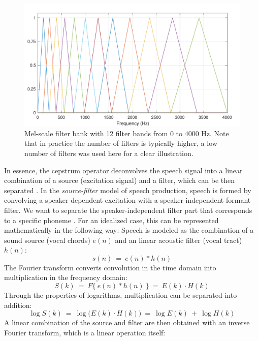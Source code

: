 \documentclass[english, 12pt, a4paper, pdftex, elec, utf8]{aaltothesis}
\begin{document}
\begin{figure}[t]
	\centering
	\includegraphics[trim={0.1cm 0cm 0cm 0.5cm}, clip, width=\textwidth]{melfilter.pdf}
	\caption{Mel-scale filter bank with 12 filter bands from 0 to 4000 Hz. Note that in practice the number of filters is typically higher, a low number of filters was used here for a clear illustration.}
	\label{fig:melbank} 
\end{figure}
In essence, the cepstrum operator deconvolves the speech signal into a linear combination of a source (excitation signal) and a filter, which can be then separated \cite[p.~306--307]{huang2001spoken}. In the \textit{source-filter} model of speech production, speech is formed by convolving a speaker-dependent excitation with a speaker-independent formant filter. We want to separate the speaker-independent filter part that corresponds to a specific phoneme \cite[p.~288--290]{huang2001spoken}. For an idealized case, this can be represented mathematically in the following way: Speech is modeled as the combination of a sound source (vocal chords) $e(n)$ and an linear acoustic filter (vocal tract) $h(n)$:
\begin{equation}
s(n) \ = \ e(n) * h(n)
\end{equation}
The Fourier transform converts convolution in the time domain into multiplication in the frequency domain:
\begin{equation}
S(k) \ = \ F\big\{ \ e(n) * h(n) \ \big\} \ = \ E(k) \cdot H(k)
\end{equation}
Through the properties of logarithms, multiplication can be separated into addition:
\begin{equation}
\log S(k) \ = \ \log \big( E(k) \cdot H(k) \big) \ = \ \log E(k) \ + \ \log H(k)
\end{equation}
A linear combination of the source and filter are then obtained with an inverse Fourier transform, which is a linear operation itself:
\end{document}
